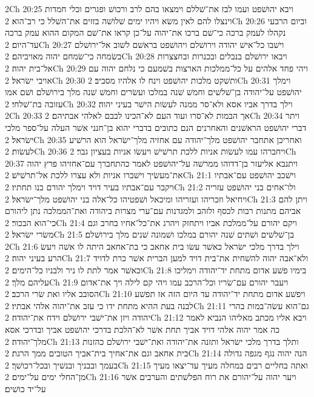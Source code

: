2Ch 20:25  ויבא יהושׁפט ועמו לבז את־שׁללם וימצאו בהם לרב ורכושׁ ופגרים וכלי חמדות וינצלו להם לאין משׂא ויהיו ימים שׁלושׁה בזזים את־השׁלל כי רב־הוא׃
2Ch 20:26  וביום הרבעי נקהלו לעמק ברכה כי־שׁם ברכו את־יהוה על־כן קראו את־שׁם המקום ההוא עמק ברכה עד־היום׃
2Ch 20:27  וישׁבו כל־אישׁ יהודה וירושׁלם ויהושׁפט בראשׁם לשׁוב אל־ירושׁלם בשׂמחה כי־שׂמחם יהוה מאויביהם׃
2Ch 20:28  ויבאו ירושׁלם בנבלים ובכנרות ובחצצרות אל־בית יהוה׃
2Ch 20:29  ויהי פחד אלהים על כל־ממלכות הארצות בשׁמעם כי נלחם יהוה עם אויבי ישׂראל׃
2Ch 20:30  ותשׁקט מלכות יהושׁפט וינח לו אלהיו מסביב׃
2Ch 20:31  וימלך יהושׁפט על־יהודה בן־שׁלשׁים וחמשׁ שׁנה במלכו ועשׂרים וחמשׁ שׁנה מלך בירושׁלם ושׁם אמו עזובה בת־שׁלחי׃
2Ch 20:32  וילך בדרך אביו אסא ולא־סר ממנה לעשׂות הישׁר בעיני יהוה׃
2Ch 20:33  אך הבמות לא־סרו ועוד העם לא־הכינו לבבם לאלהי אבתיהם׃
2Ch 20:34  ויתר דברי יהושׁפט הראשׁנים והאחרנים הנם כתובים בדברי יהוא בן־חנני אשׁר העלה על־ספר מלכי ישׂראל׃
2Ch 20:35  ואחריכן אתחבר יהושׁפט מלך־יהודה עם אחזיה מלך־ישׂראל הוא הרשׁיע לעשׂות׃
2Ch 20:36  ויחברהו עמו לעשׂות אניות ללכת תרשׁישׁ ויעשׂו אניות בעציון גבר׃
2Ch 20:37  ויתנבא אליעזר בן־דדוהו ממרשׁה על־יהושׁפט לאמר כהתחברך עם־אחזיהו פרץ יהוה את־מעשׂיך וישׁברו אניות ולא עצרו ללכת אל־תרשׁישׁ׃
2Ch 21:1  וישׁכב יהושׁפט עם־אבתיו ויקבר עם־אבתיו בעיר דויד וימלך יהורם בנו תחתיו׃
2Ch 21:2  ולו־אחים בני יהושׁפט עזריה ויחיאל וזכריהו ועזריהו ומיכאל ושׁפטיהו כל־אלה בני יהושׁפט מלך־ישׂראל׃
2Ch 21:3  ויתן להם אביהם מתנות רבות לכסף ולזהב ולמגדנות עם־ערי מצרות ביהודה ואת־הממלכה נתן ליהורם כי־הוא הבכור׃
2Ch 21:4  ויקם יהורם על־ממלכת אביו ויתחזק ויהרג את־כל־אחיו בחרב וגם משׂרי ישׂראל׃
2Ch 21:5  בן־שׁלשׁים ושׁתים שׁנה יהורם במלכו ושׁמונה שׁנים מלך בירושׁלם׃
2Ch 21:6  וילך בדרך מלכי ישׂראל כאשׁר עשׂו בית אחאב כי בת־אחאב היתה לו אשׁה ויעשׂ הרע בעיני יהוה׃
2Ch 21:7  ולא־אבה יהוה להשׁחית את־בית דויד למען הברית אשׁר כרת לדויד וכאשׁר אמר לתת לו ניר ולבניו כל־הימים׃
2Ch 21:8  בימיו פשׁע אדום מתחת יד־יהודה וימליכו עליהם מלך׃
2Ch 21:9  ויעבר יהורם עם־שׂריו וכל־הרכב עמו ויהי קם לילה ויך את־אדום הסובב אליו ואת שׂרי הרכב׃
2Ch 21:10  ויפשׁע אדום מתחת יד־יהודה עד היום הזה אז תפשׁע לבנה בעת ההיא מתחת ידו כי עזב את־יהוה אלהי אבתיו׃
2Ch 21:11  גם־הוא עשׂה־במות בהרי יהודה ויזן את־ישׁבי ירושׁלם וידח את־יהודה׃
2Ch 21:12  ויבא אליו מכתב מאליהו הנביא לאמר כה אמר יהוה אלהי דויד אביך תחת אשׁר לא־הלכת בדרכי יהושׁפט אביך ובדרכי אסא מלך־יהודה׃
2Ch 21:13  ותלך בדרך מלכי ישׂראל ותזנה את־יהודה ואת־ישׁבי ירושׁלם כהזנות בית אחאב וגם את־אחיך בית־אביך הטובים ממך הרגת׃
2Ch 21:14  הנה יהוה נגף מגפה גדולה בעמך ובבניך ובנשׁיך ובכל־רכושׁך׃
2Ch 21:15  ואתה בחליים רבים במחלה מעיך עד־יצאו מעיך מן־החלי ימים על־ימים׃
2Ch 21:16  ויער יהוה על־יהורם את רוח הפלשׁתים והערבים אשׁר על־יד כושׁים׃
